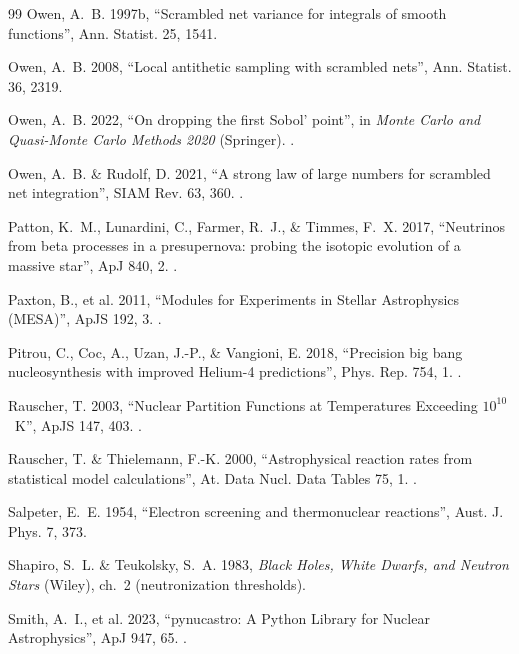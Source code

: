 \begin{thebibliography}{99}
Owen, A.~B. 1997b, ``Scrambled net variance for integrals of smooth
functions'', Ann. Statist. 25, 1541.

Owen, A.~B. 2008, ``Local antithetic sampling with scrambled nets'', Ann.
Statist. 36, 2319.

Owen, A.~B. 2022, ``On dropping the first Sobol' point'', in \emph{Monte Carlo
and Quasi-Monte Carlo Methods 2020} (Springer). .

Owen, A.~B. \& Rudolf, D. 2021, ``A strong law of large numbers for scrambled
net integration'', SIAM Rev. 63, 360. .

Patton, K.~M., Lunardini, C., Farmer, R.~J., \& Timmes, F.~X. 2017,
``Neutrinos from beta processes in a presupernova: probing the isotopic
evolution of a massive star'', ApJ 840, 2. .

Paxton, B., et al. 2011, ``Modules for Experiments in Stellar Astrophysics
(MESA)'', ApJS 192, 3. .

Pitrou, C., Coc, A., Uzan, J.-P., \& Vangioni, E. 2018, ``Precision big bang
nucleosynthesis with improved Helium-4 predictions'', Phys. Rep. 754, 1.
.

Rauscher, T. 2003, ``Nuclear Partition Functions at Temperatures Exceeding
$10^{10}$~K'', ApJS 147, 403. .

Rauscher, T. \& Thielemann, F.-K. 2000, ``Astrophysical reaction rates from
statistical model calculations'', At. Data Nucl. Data Tables 75, 1.
.

Salpeter, E.~E. 1954, ``Electron screening and thermonuclear reactions'',
Aust. J. Phys. 7, 373.

Shapiro, S.~L. \& Teukolsky, S.~A. 1983, \emph{Black Holes, White Dwarfs, and
Neutron Stars} (Wiley), ch.~2 (neutronization thresholds).

Smith, A.~I., et al. 2023, ``pynucastro: A Python Library for Nuclear
Astrophysics'', ApJ 947, 65. .


\end{thebibliography}
